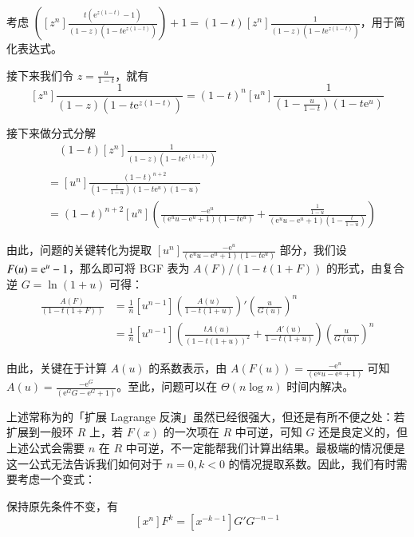 \begin{solution} 考虑 $\left([z^n]\frac{t(\mathrm e^{z(1-t)}-1)}{(1-z) (1-t \mathrm e^{z(1-t)})}\right) + 1 = (1-t)[z^n] \frac 1{(1-z)(1-t\mathrm e^{z(1-t)})}$，用于简化表达式。

接下来我们令 $z = \frac u{1-t}$，就有
$$
[z^n]\frac 1{(1-z)(1-t\mathrm e^{z(1-t)})} = (1-t)^n[u^n] \frac1{(1-\frac u{1-t})(1-t\mathrm{e}^u)}
$$

接下来做分式分解
\begin{align*}
 &\quad (1-t)[z^n] \frac 1{(1-z)(1-t\mathrm e^{z(1-t)})}\\
 &= [u^n]\frac{(1-t)^{n+2}}{(1-\frac{t}{1-u})(1-t\mathrm e^u)(1-u)}\\
 &= (1-t)^{n+2} [u^n] \left(\frac{-\mathrm e^u}{\left(\mathrm e^u u-\mathrm e^u+1\right) \left(1-t \mathrm e^u\right)}+\frac{\frac{1}{1-u}}{\left(\mathrm e^u   u-\mathrm e^u+1\right) (1-\frac{t}{1-u})}\right)\end{align*}

由此，问题的关键转化为提取 $[u^n] \frac{-\mathrm e^u}{\left(\mathrm e^u u-\mathrm e^u+1\right) \left(1-t \mathrm e^u\right)}$ 部分，我们设 $F(u) = \mathrm{e}^u-1$，那么即可将 BGF 表为 $A(F)/(1-t(1+F))$ 的形式，由复合逆 $G=\ln(1+u)$ 可得：
\begin{align*}
[u^n] \frac{A(F)}{(1-t(1+F))}
&= \frac 1n[u^{n-1}] \left(\frac{A(u)}{1-t(1+u)}\right)' \left(\frac u{G(u)}\right)^n\\
&= \frac 1n[u^{n-1}] \left( \frac{tA(u)}{(1-t(1+u))^2} + \frac{A'(u)}{1-t(1+u)} \right) \left(\frac u{G(u)}\right)^n
\end{align*}

由此，关键在于计算 $A(u)$ 的系数表示，由 $A(F(u)) = \frac{-\mathrm e^u}{\left(\mathrm e^u u-\mathrm e^u+1\right)}$ 可知 $A(u) = \frac{-\mathrm e^G}{\left(\mathrm e^G G-\mathrm e^G+1\right)}$。至此，问题可以在 $\Theta(n\log n)$ 时间内解决。
\end{solution}

上述常称为的「扩展 Lagrange 反演」虽然已经很强大，但还是有所不便之处：若扩展到一般环 $R$ 上，若 $F(x)$ 的一次项在 $R$ 中可逆，可知 $G$ 还是良定义的，但上述公式会需要 $n$ 在 $R$ 中可逆，不一定能帮我们计算出结果。最极端的情况便是这一公式无法告诉我们如何对于 $n=0,k<0$ 的情况提取系数。因此，我们有时需要考虑一个变式：

\begin{lemma}[另类 Lagrange 反演]
保持原先条件不变，有
$$
[x^n]F^k = [x^{-k-1}]G'G^{-n-1}
$$
\end{lemma}

